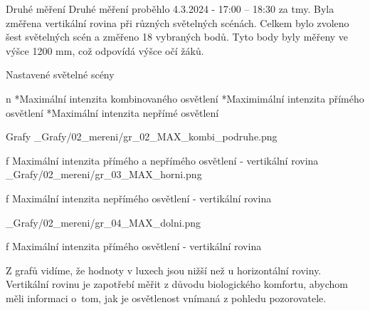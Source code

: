 \sec Druhé měření
Druhé měření proběhlo 4.3.2024 - 17:00 – 18:30 za tmy. Byla změřena vertikální rovina při různých světelných scénách. Celkem bylo zvoleno šest světelných scén a změřeno 18 vybraných bodů. Tyto body byly měřeny ve výšce 1200 mm, což odpovídá výšce očí žáků.
\medskip

{\sbf Nastavené světelné scény}

\begitems \style n
    *Maximální intenzita kombinovaného osvětlení
    *Maximimální intenzita přímého osvětlení
    *Maximální intenzita nepřímé osvětlení
\enditems

\secc Grafy
\medskip {}
\picw=15cm _Grafy/02_mereni/gr_02_MAX_kombi_podruhe.png
\caption/f Maximální intenzita přímého a nepřímého osvětlení - vertikální rovina
\medskip {}
\picw=15cm _Grafy/02_mereni/gr_03_MAX_horni.png
\caption/f Maximální intenzita nepřímého osvětlení - vertikální rovina

\medskip {}
\picw=15cm _Grafy/02_mereni/gr_04_MAX_dolni.png
\caption/f Maximální intenzita přímého osvětlení - vertikální rovina
\medskip

Z grafů vidíme, že hodnoty v luxech jsou nižší než u horizontální roviny. Vertikální rovinu je zapotřebí měřit z důvodu biologického komfortu, abychom měli informaci o~tom, jak je osvětlenost vnímaná z pohledu pozorovatele.



